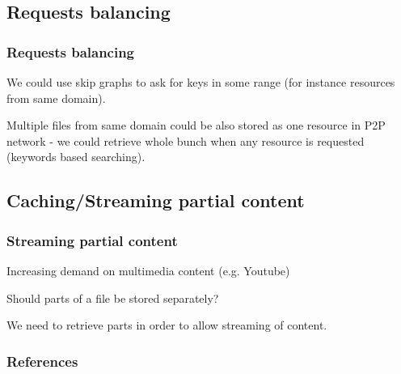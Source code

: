 \documentclass{beamer}
\begin{document}
\subsection{Requests balancing}
\begin{frame}
\frametitle{Requests balancing}

\begin{block}{}
We could use skip graphs \citep{aspnes2007skip} to ask for keys in some range 
(for instance resources from same domain). 
\end{block}

\begin{block}{}
Multiple files from same domain could be also stored as one resource
in P2P network - we could retrieve whole bunch when any resource is requested
(keywords based searching).
\end{block}

\end{frame}

\subsection{Caching/Streaming partial content}

\begin{frame}
\frametitle{Streaming partial content}
\begin{block}{}
Increasing demand on multimedia content (e.g. Youtube)
\end{block}

\begin{block}{}
Should parts of a file be stored separately?
\end{block}

\begin{block}{}
We need to retrieve parts in order to allow streaming of content.
\end{block}

\end{frame}

\begin{frame}[allowframebreaks]
\frametitle{References}


\end{frame}
\end{document}
